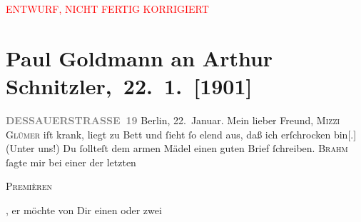 
\begin{center}
            \textcolor{red}{ENTWURF, NICHT FERTIG KORRIGIERT}
                      \end{center}
            
         
         \renewcommand{\erwaehntePersonen}{Personen: Richard Beer-Hofmann, Otto Brahm, Marie Glümer, Alfred Kerr, Olga Schnitzler, Stefan Vacano}
         \renewcommand{\erwaehnteInstitutionen}{Institutionen: Deutsches Theater Berlin}
         \renewcommand{\erwaehnteOrte}{Orte: Berlin, Dessauer Straße, Wien}
         \renewcommand{\erwaehnteWerke}{Werke: Der Tag, Michael Kramer. Drama, Neue Freie Presse, Zum großen Wurstel. Burleske in einem Akt, »Michael Kramer.«}
               \section[ Paul Goldmann an Arthur Schnitzler, 22. 1. {[}1901{]}]{ Paul Goldmann an Arthur Schnitzler, 22. 1. {[}1901{]}}\nopagebreak{}\rehead{ }\begin{ledgroupsized}[t]{13cm}\normalsize\beginnumbering \toendnotes[C]{\smallbreak\pagebreak[2]} 
\toendnotes[C]{\smallbreak}\pstart
           \noindent{}\raggedleft{}{\pb}\textcolor{gray}{\textbf{DESSAUERSTRASSE 19}}\pend
           \pstart
           Berlin, 22. Januar.\pend
           \pstart\center{}Mein lieber Freund,\pend\pstart
           \textsc{Mizzi Glümer} iſt krank, liegt zu Bett und ſieht ſo elend aus, daß ich erſchrocken
                  bin{[}.{]} (Unter uns!) Du ſollteſt dem armen Mädel einen guten Brief ſchreiben.\pend
           \pstart
           \textsc{Brahm} ſagte mir bei einer der letzten \begin{otherlanguage}{french}\textsc{Premièren}\end{otherlanguage}, er möchte von Dir einen oder zwei \label{K_L03055-1v}
\end{ledgroupsized}
